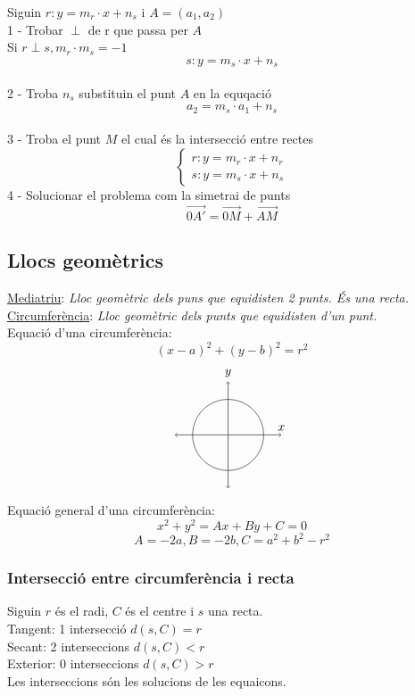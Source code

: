\documentclass[12pt,a4paper]{article}
\begin{document}
Siguin $r: y=m_r\cdot x+n_s$ i $A=(a_1, a_2)$\\[10pt]
1 - Trobar $\perp$ de r que passa per $A$\\[5pt]
Si $r \perp s, m_r \cdot m_s = -1$\\
$$s: y = m_s\cdot x +n_s$$\\[10pt]
2 - Troba $n_s$ substituin el punt $A$ en la equqació \\[5pt]
$$a_2 = m_s \cdot a_1 + n_s$$\\[10pt]
3 - Troba el punt $M$ el cual és la intersecció entre rectes\\[5pt]
$$\begin{cases}
    r: y = m_r \cdot x + n_r \\
    s: y = m_s \cdot x + n_s
\end{cases}
$$
4 - Solucionar el problema com la simetrai de punts
$$\vec{0A'} = \vec{0M} + \vec{AM}$$
\newpage
\subsection{Llocs geomètrics}
\underline{Mediatriu}: \textit{Lloc geomètric dels puns que equidisten 2 punts. És una recta.}\\
\underline{Circumferència}: \textit{Lloc geomètric dels punts que equidisten d'un punt.}\\
Equació d'una circumferència:
$$\left(x-a\right)^2+\left(y-b\right)^2=r^2$$
\begin{align*}
    \begin{tikzpicture}
        \draw[<->] (-1.5, 0) -- (1.5, 0) node[above] {$x$};
        \draw[<->] (0, -1.5) -- (0, 1.5) node[above] {$y$};
        \draw(0, 0) circle (1cm);
    \end{tikzpicture}
\end{align*}
Equació general d'una circumferència:
$$x^2+y^2=Ax+By+C=0$$
$$A=-2a, B=-2b, C=a^2+b^2-r^2$$
\subsubsection{Intersecció entre circumferència i recta}
Siguin $r$ és el radi, $C$ és el centre i $s$ una recta.\\[10pt]
Tangent: 1 intersecció $d(s, C) = r$\\
Secant: 2 interseccions $d(s, C) < r$\\
Exterior: 0 interseccions $d(s, C) > r$\\[5pt]
Les interseccions són les solucions de les equaicons.
\end{document}
